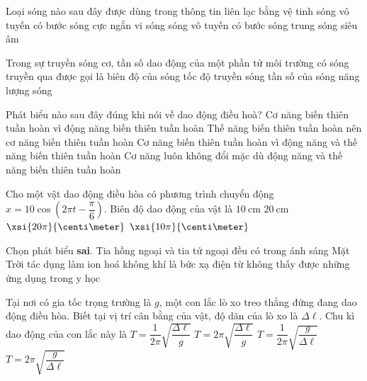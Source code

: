 \begin{ex}
Loại sóng nào sau đây được dùng trong thông tin liên lạc bằng vệ tinh
	\choice
	{\True sóng vô tuyến có bước sóng cực ngắn}
	{vi sóng}
	{sóng vô tuyến có bước sóng trung}
	{sóng siêu âm}
	\loigiai{}
\end{ex}
\begin{ex}
Trong sự truyền sóng cơ, tần số dao động của một phần tử môi trường có sóng truyền qua được gọi là
	\choice
	{biên độ của sóng}
	{tốc độ truyền sóng}
	{\True tần số của sóng}
	{năng lượng sóng}
	\loigiai{}
\end{ex}
\begin{ex}
Phát biểu nào sau đây đúng khi nói về dao động điều hoà?
	\choice
	{Cơ năng biến thiên tuần hoàn vì động năng biến thiên tuần hoàn}
	{Thế năng biến thiên tuần hoàn nên cơ năng biến thiên tuần hoàn}
	{Cơ năng biến thiên tuần hoàn vì động năng và thế năng biến thiên tuần hoàn}
	{\True Cơ năng luôn không đổi mặc dù động năng và thế năng biến thiên tuần hoàn}
	\loigiai{}
\end{ex}
\begin{ex}
Cho một vật dao động điều hòa có phương trình chuyển động $x=10\cos\left(2\pi t-\dfrac{\pi}{6}\right)$. Biên độ dao động của vật là
	\choice
	{\True $\SI{10}{\centi\meter}$}
	{$\SI{20}{\centi\meter}$}
	{$\xsi{20\pi}{\centi\meter}$}
	{$\xsi{10\pi}{\centi\meter}$}
	\loigiai{}
\end{ex}
\begin{ex}
Chọn phát biểu \textbf{sai}. Tia hồng ngoại và tia tử ngoại đều có
	\choice
	{trong ánh sáng Mặt Trời}
	{\True tác dụng làm ion hoá không khí}
	{là bức xạ điện từ không thấy được}
	{những ứng dụng trong y học}
	\loigiai{}
\end{ex}
\begin{ex}
Tại nơi có gia tốc trọng trường là $g$, một con lắc lò xo treo thẳng đứng đang dao động điều hòa. Biết tại vị trí cân bằng của vật, độ dãn của lò xo là $\Delta\ell$. Chu kì dao động của con lắc này là
	\choice
	{$T=\dfrac{1}{2\pi}\sqrt{\dfrac{\Delta\ell}{g}}$}
	{$T=2\pi\sqrt{\dfrac{\Delta\ell}{g}}$}
	{$T=\dfrac{1}{2\pi}\sqrt{\dfrac{g}{\Delta\ell}}$}
	{\True $T=2\pi\sqrt{\dfrac{g}{\Delta\ell}}$}
	\loigiai{}
\end{ex}

